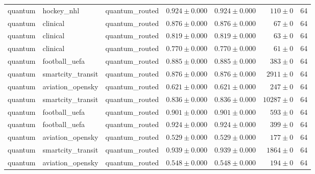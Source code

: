 \begin{table}[htbp]
\begin{tabular}{l l l r r r r}
quantum & hockey\_nhl & quantum\_routed & $0.924\pm0.000$ & $0.924\pm0.000$ & $110\pm0$ & 64 \\
quantum & clinical & quantum\_routed & $0.876\pm0.000$ & $0.876\pm0.000$ & $67\pm0$ & 64 \\
quantum & clinical & quantum\_routed & $0.819\pm0.000$ & $0.819\pm0.000$ & $63\pm0$ & 64 \\
quantum & clinical & quantum\_routed & $0.770\pm0.000$ & $0.770\pm0.000$ & $61\pm0$ & 64 \\
quantum & football\_uefa & quantum\_routed & $0.885\pm0.000$ & $0.885\pm0.000$ & $383\pm0$ & 64 \\
quantum & smartcity\_transit & quantum\_routed & $0.876\pm0.000$ & $0.876\pm0.000$ & $2911\pm0$ & 64 \\
quantum & aviation\_opensky & quantum\_routed & $0.621\pm0.000$ & $0.621\pm0.000$ & $247\pm0$ & 64 \\
quantum & smartcity\_transit & quantum\_routed & $0.836\pm0.000$ & $0.836\pm0.000$ & $10287\pm0$ & 64 \\
quantum & football\_uefa & quantum\_routed & $0.901\pm0.000$ & $0.901\pm0.000$ & $593\pm0$ & 64 \\
quantum & football\_uefa & quantum\_routed & $0.924\pm0.000$ & $0.924\pm0.000$ & $399\pm0$ & 64 \\
quantum & aviation\_opensky & quantum\_routed & $0.529\pm0.000$ & $0.529\pm0.000$ & $177\pm0$ & 64 \\
quantum & smartcity\_transit & quantum\_routed & $0.939\pm0.000$ & $0.939\pm0.000$ & $1864\pm0$ & 64 \\
quantum & aviation\_opensky & quantum\_routed & $0.548\pm0.000$ & $0.548\pm0.000$ & $194\pm0$ & 64 \\
\hline
\end{tabular}
\end{table}
